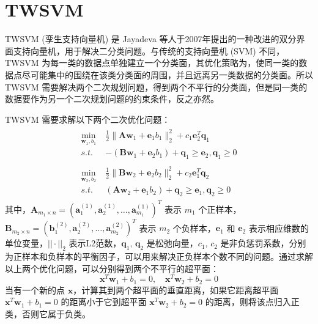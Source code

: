 \section{TWSVM}

TWSVM (孪生支持向量机) 是 Jayadeva 等人于2007年提出的一种改进的双分界面支持向量机，用于解决二分类问题。与传统的支持向量机 (SVM) 不同，TWSVM 为每一类的数据点单独建立一个分类面，其优化策略为，使同一类的数据点尽可能集中的围绕在该类分类面的周围，并且远离另一类数据的分类面。所以 TWSVM 需要解决两个二次规划问题，得到两个不平行的分类面，但是同一类的数据要作为另一个二次规划问题的约束条件，反之亦然。

TWSVM 需要求解以下两个二次优化问题：
\begin{align}
\begin{split}
\label{ts1}
\min_{\mathbf{w}_1,b_1} \; & \frac{1}{2}\|\mathbf{Aw}_1+\mathbf{e}_1b_1\|_2^2+c_1\mathbf{e}_2^T\mathbf{q}_1 \\
s.t.\; & -(\mathbf{Bw}_1+\mathbf{e}_2b_1)+\mathbf{q}_1 \geq \mathbf{e}_2,\mathbf{q}_1\geq 0
\end{split}
\\
\begin{split}
\label{ts2}
\min_{\mathbf{w}_2,b_2} \; & \frac{1}{2}\|\mathbf{Bw}_2+\mathbf{e}_2b_2\|_2^2+c_2\mathbf{e}_1^T\mathbf{q}_2 \\
s.t. \; & (\mathbf{Aw}_2+\mathbf{e}_1b_2)+\mathbf{q}_2\geq \mathbf{e}_1, \mathbf{q}_2\geq 0
\end{split}
\end{align}
其中，$\mathbf{A}_{m_1 \times n}=(\mathbf{a}_1^{(1)},\mathbf{a}_2^{(1)},\ldots,\mathbf{a}_{m_1}^{(1)})^T$ 表示 $m_1$ 个正样本，$\mathbf{B}_{m_2 \times n }=(\mathbf{b}_1^{(2)},\mathbf{a}_2^{(2)},\ldots,\mathbf{a}_{m_2}^{(2)})^T$ 表示 $m_2$ 个负样本，$\mathbf{e}_1$ 和 $\mathbf{e}_2$ 表示相应维数的单位变量，$||\cdot||_2$ 表示L2范数，$\mathbf{q}_1, \, \mathbf{q}_2$ 是松弛向量，$c_1, \, c_2$ 是非负惩罚系数，分别为正样本和负样本的平衡因子，可以用来解决正负样本个数不同的问题。通过求解以上两个优化问题，可以分别得到两个不平行的超平面：
\begin{equation}
\mathbf{x}^T\mathbf{w}_1+b_1=0, \quad \mathbf{x}^T\mathbf{w}_2+b_2=0
\end{equation}
当有一个新的点 $\mathbf{x}$，计算其到两个超平面的垂直距离，如果它距离超平面 $\mathbf{x}^T\mathbf{w}_1+b_1=0$ 的距离小于它到超平面 $\mathbf{x}^T\mathbf{w}_2+b_2=0$ 的距离，则将该点归入正类，否则它属于负类。

